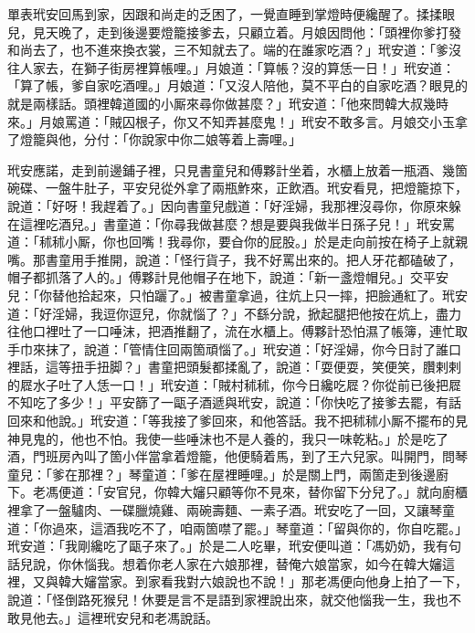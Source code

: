 單表玳安回馬到家，因跟和尚走的乏困了，一覺直睡到掌燈時便纔醒了。揉揉眼兒，見天晚了，走到後邊要燈籠接爹去，只顧立着。月娘因問他：「頭裡你爹打發和尚去了，也不進來換衣裳，三不知就去了。端的在誰家吃酒？」玳安道：「爹沒往人家去，在獅子街房裡算帳哩。」月娘道：「算帳？沒的算恁一日！」玳安道：「算了帳，爹自家吃酒哩。」月娘道：「又沒人陪他，莫不平白的自家吃酒？眼見的就是兩樣話。頭裡韓道國的小厮來尋你做甚麼？」玳安道：「他來問韓大叔幾時來。」月娘罵道：「賊囚根子，你又不知弄甚麼鬼！」玳安不敢多言。月娘交小玉拿了燈籠與他，分付：「你說家中你二娘等着上壽哩。」

玳安應諾，走到前邊鋪子裡，只見書童兒和傅夥計坐着，水櫃上放着一瓶酒、幾箇碗碟、一盤牛肚子，平安兒從外拿了兩瓶鮓來，正飲酒。玳安看見，把燈籠掠下，說道：「好呀！我趕着了。」因向書童兒戲道：「好淫婦，我那裡沒尋你，你原來躲在這裡吃酒兒。」書童道：「你尋我做甚麼？想是要與我做半日孫子兒！」玳安罵道：「秫秫小厮，你也回嘴！我尋你，要㒲你的屁股。」於是走向前按在椅子上就親嘴。那書童用手推開，說道：「怪行貨子，我不好罵出來的。把人牙花都磕破了，帽子都抓落了人的。」傅夥計見他帽子在地下，說道：「新一盞燈帽兒。」交平安兒：「你替他拾起來，只怕躧了。」被書童拿過，往炕上只一摔，把臉通紅了。玳安道：「好淫婦，我逗你逗兒，你就惱了？」不繇分說，掀起腿把他按在炕上，盡力往他口裡吐了一口唾沫，把酒推翻了，流在水櫃上。傅夥計恐怕濕了帳簿，連忙取手巾來抹了，說道：「管情住回兩箇頑惱了。」玳安道：「好淫婦，你今日討了誰口裡話，這等扭手扭脚？」書童把頭髮都揉亂了，說道：「耍便耍，笑便笑，臢剌剌的㞞水子吐了人恁一口！」玳安道：「賊村秫秫，你今日纔吃㞞？你從前已後把㞞不知吃了多少！」平安篩了一甌子酒遞與玳安，說道：「你快吃了接爹去罷，有話回來和他說。」玳安道：「等我接了爹回來，和他答話。我不把秫秫小厮不擺布的見神見鬼的，他也不怕。我使一些唾沫也不是人養的，我只一味乾粘。」於是吃了酒，門班房內叫了箇小伴當拿着燈籠，他便騎着馬，到了王六兒家。叫開門，問琴童兒：「爹在那裡？」琴童道：「爹在屋裡睡哩。」於是關上門，兩箇走到後邊廚下。老馮便道：「安官兒，你韓大嬸只顧等你不見來，替你留下分兒了。」就向廚櫃裡拿了一盤驢肉、一碟臘燒雞、兩碗壽麵、一素子酒。玳安吃了一回，又讓琴童道：「你過來，這酒我吃不了，咱兩箇噤了罷。」琴童道：「留與你的，你自吃罷。」玳安道：「我剛纔吃了甌子來了。」於是二人吃畢，玳安便叫道：「馮奶奶，我有句話兒說，你休惱我。想着你老人家在六娘那裡，替俺六娘當家，如今在韓大嬸這裡，又與韓大嬸當家。{}到家看我對六娘說也不說！」那老馮便向他身上拍了一下，說道：「怪倒路死猴兒！休要是言不是語到家裡說出來，就交他惱我一生，我也不敢見他去。」這裡玳安兒和老馮說話。

